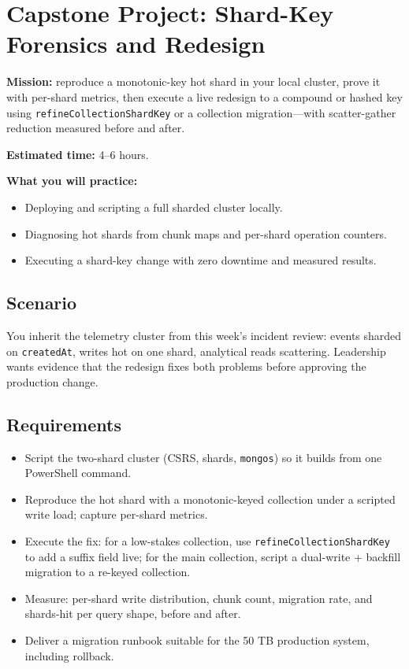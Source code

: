 \section{Capstone Project: Shard-Key Forensics and Redesign}\label{sec:ch7-capstone}

\begin{capstonebox}
\textbf{Mission:} reproduce a monotonic-key hot shard in your local cluster, prove it with per-shard metrics, then execute a live redesign to a compound or hashed key using \texttt{refineCollectionShardKey} or a collection migration---with scatter-gather reduction measured before and after.

\textbf{Estimated time:} 4--6 hours.

\textbf{What you will practice:}
\begin{itemize}
    \item Deploying and scripting a full sharded cluster locally.
    \item Diagnosing hot shards from chunk maps and per-shard operation counters.
    \item Executing a shard-key change with zero downtime and measured results.
\end{itemize}
\end{capstonebox}

\subsection*{Scenario}
You inherit the telemetry cluster from this week's incident review: events sharded on \texttt{createdAt}, writes hot on one shard, analytical reads scattering. Leadership wants evidence that the redesign fixes both problems before approving the production change.

\subsection*{Requirements}
\begin{itemize}
    \item Script the two-shard cluster (CSRS, shards, \texttt{mongos}) so it builds from one PowerShell command.
    \item Reproduce the hot shard with a monotonic-keyed collection under a scripted write load; capture per-shard metrics.
    \item Execute the fix: for a low-stakes collection, use \texttt{refineCollectionShardKey} to add a suffix field live; for the main collection, script a dual-write + backfill migration to a re-keyed collection.
    \item Measure: per-shard write distribution, chunk count, migration rate, and shards-hit per query shape, before and after.
    \item Deliver a migration runbook suitable for the 50 TB production system, including rollback.
\end{itemize}

